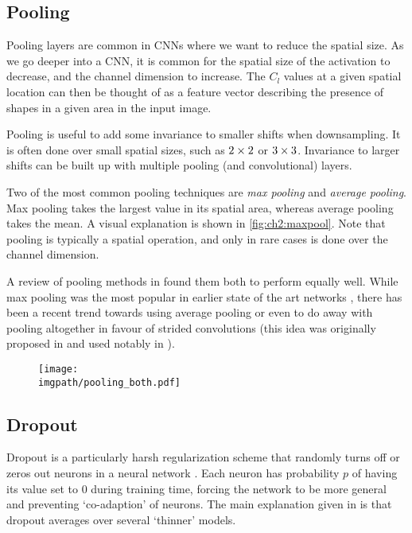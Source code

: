 \subsection{Pooling}
Pooling layers are common in CNNs where we want to reduce the spatial size. As
we go deeper into a CNN, it is common for the spatial size of the activation to
decrease, and the channel dimension to increase. The $C_l$ values at a given
spatial location can then be thought of as a feature vector describing the
presence of shapes in a given area in the input image.

Pooling is useful to add some invariance to smaller shifts when downsampling. It
is often done over small spatial sizes, such as $2\times 2$ or $3\times 3$. Invariance
to larger shifts can be built up with multiple pooling (and convolutional) layers.

Two of the most common pooling techniques are \emph{max pooling} and
\emph{average pooling}. Max pooling takes the largest value in its spatial area,
whereas average pooling takes the mean. A visual explanation is shown in 
\autoref{fig:ch2:maxpool}. Note that pooling is typically a spatial operation,
and only in rare cases is done over the channel dimension.

A review of pooling methods in \cite{mishkin_systematic_2016} found them both
to perform equally well. While max pooling was the most popular in earlier state
of the art networks \cite{krizhevsky_imagenet_2012, simonyan_very_2014},
there has been a recent trend towards using average pooling \cite{huang_densely_2017}
or even to do away with pooling altogether in favour of strided convolutions
(this idea was originally proposed in \cite{springenberg_striving_2014-3} and
used notably in \cite{he_deep_2016, xie_aggregated_2017,
zagoruyko_wide_2016-1}).
  
\begin{figure}
  \centering
  \texttt{[image: \\imgpath/pooling\_both.pdf]}
  \label{fig:ch2:maxpool}
\end{figure}

\subsection{Dropout}
Dropout is a particularly harsh regularization scheme that randomly turns off
or zeros out neurons in a neural network \cite{hinton_improving_2012, srivastava_dropout:_2014}.
Each neuron has probability $p$ of having its value set to 0 during training
time, forcing the network to be more general and preventing `co-adaption' of
neurons. The main explanation given in \cite{srivastava_dropout:_2014} is
that dropout averages over several `thinner' models.

